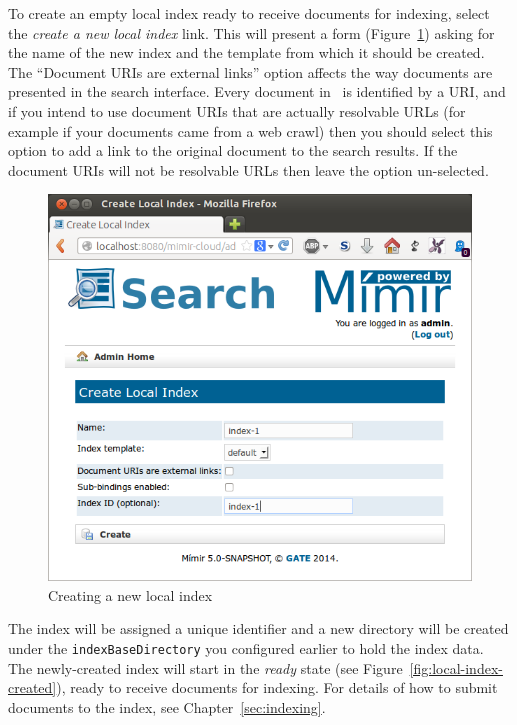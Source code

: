 To create an empty local index ready to receive documents for indexing, select
the {\em create a new local index} link.  This will present a form
(Figure~\ref{fig:new-local-index}) asking for the name of the new index and the
template from which it should be created.  The ``Document URIs are external
links'' option affects the way documents are presented in the search interface.
Every document in \Mimir\ is identified by a URI, and if you intend to use
document URIs that are actually resolvable URLs (for example if your documents
came from a web crawl) then you should select this option to add a link to the
original document to the search results.  If the document URIs will not be
resolvable URLs then leave the option un-selected.
%
\begin{figure}[htb!]
\begin{center}
\includegraphics[scale=0.5]{img/new-local-index}
\end{center}
\caption{Creating a new local index}
\label{fig:new-local-index}
\end{figure}
%
The index will be assigned a unique identifier and a new directory will be
created under the \verb|indexBaseDirectory| you configured earlier to
hold the index data.  The newly-created index will start in the {\em ready}
state (see Figure~\ref{fig:local-index-created}), ready to receive documents
for indexing.  For details of how to submit documents to the index, see
Chapter~\ref{sec:indexing}.
%

